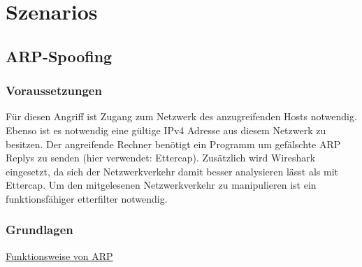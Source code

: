 \chapter{Szenarios}

\section{ARP-Spoofing}

\subsection*{Voraussetzungen}

Für diesen Angriff ist Zugang zum Netzwerk des anzugreifenden Hosts notwendig. Ebenso ist es notwendig eine gültige IPv4 Adresse aus diesem Netzwerk zu besitzen.
Der angreifende Rechner benötigt ein Programm um gefälschte ARP Replys zu senden (hier verwendet: Ettercap). Zusätzlich wird Wireshark eingesetzt, da sich der Netzwerkverkehr damit besser analysieren lässt als mit Ettercap.
Um den mitgelesenen Netzwerkverkehr zu manipulieren ist ein funktionsfähiger etterfilter notwendig.

\subsection*{Grundlagen}

\uline{Funktionsweise von ARP}

